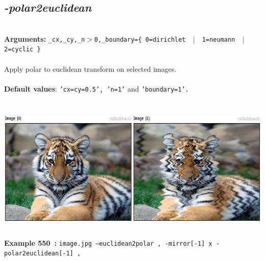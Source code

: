 \documentclass[a4paper,11pt,twoside]{book}
\begin{document}
\subsection{\emph{-polar2euclidean} }\vspace*{-0.5em}
~\\\textbf{Arguments: } 
{\small \texttt{\_cx,\_cy,\_n$>$0,\_boundary=\{ 0=dirichlet ~$|$~ 1=neumann ~$|$~ 2=cyclic \}}}\\~\\
Apply polar to euclidean transform on selected images.
~\\~\\\textbf{Default values}: {\small \texttt{'cx=cy=0.5', 'n=1'} and \texttt{'boundary=1'.}}
\begin{center}\includegraphics[keepaspectratio=true,height=7cm,width=\textwidth]{img/gmic_def550.jpg}\\
{\footnotesize \textbf{Example 550~:} \texttt{image.jpg --euclidean2polar , -mirror[-1] x -polar2euclidean[-1] ,}}
\end{center}
\end{document}
